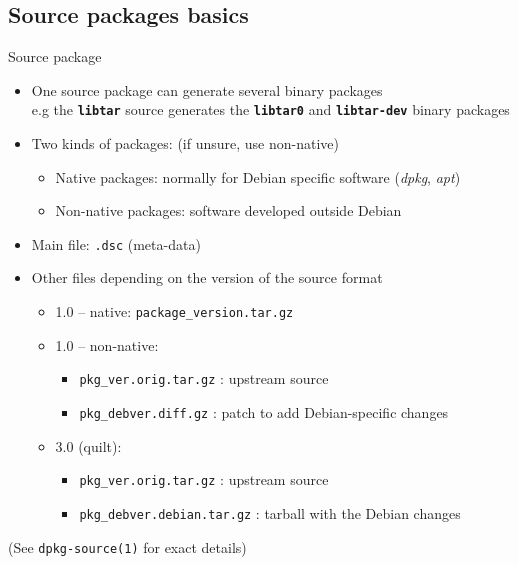 \documentclass[10pt,final]{beamer}
\begin{document}
\subsection{Source packages basics}
\begin{frame}{Source package}
  \begin{itemize}
  \item One source package can generate several binary packages\\
    {\small e.g the \texttt{\bfseries libtar} source generates the
      \texttt{\bfseries libtar0} and \texttt{\bfseries libtar-dev} binary
      packages} \hbr
  \item Two kinds of packages: (if unsure, use non-native)
    \begin{itemize}
      \small
    \item Native packages: normally for Debian specific software (\textsl{dpkg}, \textsl{apt})
    \item Non-native packages: software developed outside Debian
    \end{itemize}
    \hbr
  \item Main file: \texttt{.dsc} (meta-data)
    \hbr
  \item Other files depending on the version of the source format
    \begin{itemize}
    \item 1.0 -- native: \texttt{package\_version.tar.gz}
      \hbr
    \item 1.0 -- non-native:
      \begin{itemize}
      \item \texttt{pkg\_ver.orig.tar.gz} : upstream source
      \item \texttt{pkg\_debver.diff.gz} : patch to add Debian-specific changes
      \end{itemize}
      \hbr
    \item 3.0 (quilt):
      \begin{itemize}
      \item \texttt{pkg\_ver.orig.tar.gz} : upstream source
      \item \texttt{pkg\_debver.debian.tar.gz} : tarball with the Debian changes
      \end{itemize}
    \end{itemize}
  \end{itemize}
  \hbr
  (See \texttt{dpkg-source(1)} for exact details)
\end{frame}
\end{document}
